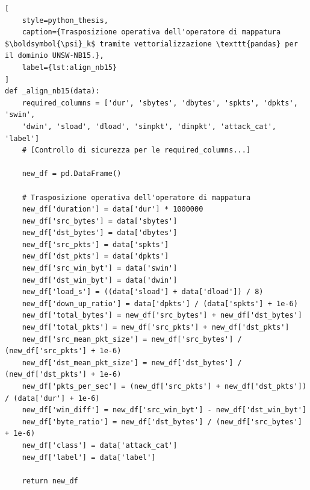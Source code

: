 \begin{lstlisting}[
    style=python_thesis,
    caption={Trasposizione operativa dell'operatore di mappatura $\boldsymbol{\psi}_k$ tramite vettorializzazione \texttt{pandas} per il dominio UNSW-NB15.},
    label={lst:align_nb15}
]
def _align_nb15(data):
    required_columns = ['dur', 'sbytes', 'dbytes', 'spkts', 'dpkts', 'swin', 
    'dwin', 'sload', 'dload', 'sinpkt', 'dinpkt', 'attack_cat', 'label']
    # [Controllo di sicurezza per le required_columns...]

    new_df = pd.DataFrame()

    # Trasposizione operativa dell'operatore di mappatura
    new_df['duration'] = data['dur'] * 1000000
    new_df['src_bytes'] = data['sbytes']
    new_df['dst_bytes'] = data['dbytes']
    new_df['src_pkts'] = data['spkts']
    new_df['dst_pkts'] = data['dpkts']
    new_df['src_win_byt'] = data['swin']
    new_df['dst_win_byt'] = data['dwin']
    new_df['load_s'] = ((data['sload'] + data['dload']) / 8)
    new_df['down_up_ratio'] = data['dpkts'] / (data['spkts'] + 1e-6)
    new_df['total_bytes'] = new_df['src_bytes'] + new_df['dst_bytes']
    new_df['total_pkts'] = new_df['src_pkts'] + new_df['dst_pkts']
    new_df['src_mean_pkt_size'] = new_df['src_bytes'] / (new_df['src_pkts'] + 1e-6)
    new_df['dst_mean_pkt_size'] = new_df['dst_bytes'] / (new_df['dst_pkts'] + 1e-6)
    new_df['pkts_per_sec'] = (new_df['src_pkts'] + new_df['dst_pkts']) / (data['dur'] + 1e-6)
    new_df['win_diff'] = new_df['src_win_byt'] - new_df['dst_win_byt']
    new_df['byte_ratio'] = new_df['dst_bytes'] / (new_df['src_bytes'] + 1e-6)
    new_df['class'] = data['attack_cat']
    new_df['label'] = data['label']

    return new_df
\end{lstlisting}

\newpage

